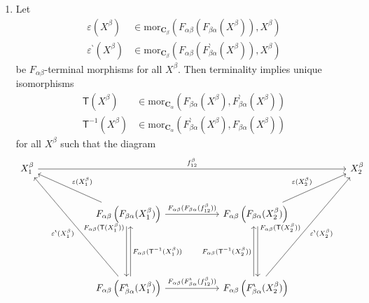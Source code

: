 \begin{prf}
\begin{enumerate}
\item[(a)]
Let
\begin{align*}
  \varepsilon(X^{\beta})
  &\in
  \mathrm{mor}_{\mathbf{C}_{\beta}}
  \left(
    F_{\alpha\beta}(F_{\beta\alpha}(X^{\beta})),
    X^{\beta}
  \right)
  \\
  \varepsilon^{\backprime}(X^{\beta})
  &\in
  \mathrm{mor}_{\mathbf{C}_{\beta}}
  \left(
    F_{\alpha\beta}(F_{\beta\alpha}^{\backprime}(X^{\beta})),
    X^{\beta}
  \right)
\end{align*}
be $F_{\alpha\beta}$-terminal morphisms for all $X^{\beta}$.
Then terminality implies unique isomorphisms
\begin{align*}
  \mathsf{T}(X^{\beta})
  &\in
  \mathrm{mor}_{\mathbf{C}_{\alpha}}
  \left(
    F_{\beta\alpha}(X^{\beta}),
    F_{\beta\alpha}^{\backprime}(X^{\beta})
  \right)
  \\
  \mathsf{T}^{-1}(X^{\beta})
  &\in
  \mathrm{mor}_{\mathbf{C}_{\alpha}}
  \left(
    F_{\beta\alpha}^{\backprime}(X^{\beta}),
    F_{\beta\alpha}(X^{\beta})
  \right)
\end{align*}
for all $X^{\beta}$ such that the diagram
\[
\begin{tikzcd}[row sep=large, column sep=5.8em]
  X_{1}^{\beta}
  \arrow{rrr}{f_{12}^{\beta}}
  &
  &
  &
  X_{2}^{\beta}
  \\
  &
  F_{\alpha\beta}
  \left(
    F_{\beta\alpha}(X_{1}^{\beta})
  \right)
  \arrow{r}{F_{\alpha\beta}(F_{\beta\alpha}(f_{12}^{\beta}))}
  \arrow[swap,shift right=0.5ex]{dd}[yshift=9mm]{F_{\alpha\beta}(\mathsf{T}(X_{1}^{\beta}))}
  \arrow[swap]{ul}{\varepsilon(X_{1}^{\beta})}
  &
  F_{\alpha\beta}
  \left(
    F_{\beta\alpha}(X_{2}^{\beta})
  \right)
  \arrow{ur}{\varepsilon(X_{2}^{\beta})}
  \arrow[shift left=0.5ex]{dd}[yshift=9mm]{F_{\alpha\beta}(\mathsf{T}(X_{2}^{\beta}))}
  &
  \\
  &
  &
  &
  \\
  &
  F_{\alpha\beta}
  \left(
    F_{\beta\alpha}^{\backprime}(X_{1}^{\beta})
  \right)
  \arrow[swap,shift right=0.5ex]{uu}{F_{\alpha\beta}(\mathsf{T}^{-1}(X_{1}^{\beta}))}
  \arrow{r}{F_{\alpha\beta}(F_{\beta\alpha}^{\backprime}(f_{12}^{\beta}))}
  \arrow{uuul}{\varepsilon^{\backprime}(X_{1}^{\beta})}
  &
  F_{\alpha\beta}
  \left(
    F_{\beta\alpha}^{\backprime}(X_{2}^{\beta})
  \right)
  \arrow[shift left=0.5ex]{uu}{F_{\alpha\beta}(\mathsf{T}^{-1}(X_{2}^{\beta}))}
  \arrow[swap]{uuur}{\varepsilon^{\backprime}(X_{2}^{\beta})}

\end{tikzcd}\]
\end{enumerate}
\end{prf}
